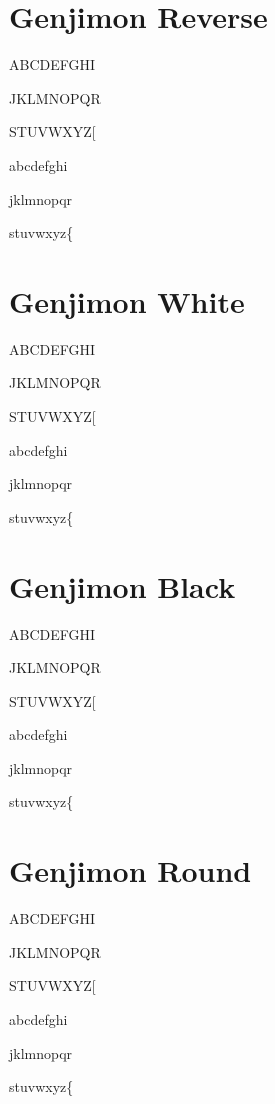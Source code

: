 \documentclass{mitsuba}
\begin{document}

\chapter{Genjimon Reverse}

{
ABCDEFGHI

JKLMNOPQR

STUVWXYZ[

abcdefghi

jklmnopqr

stuvwxyz\{}


\chapter{Genjimon White}

{
ABCDEFGHI

JKLMNOPQR

STUVWXYZ[

abcdefghi

jklmnopqr

stuvwxyz\{}


\chapter{Genjimon Black}

{
ABCDEFGHI

JKLMNOPQR

STUVWXYZ[

abcdefghi

jklmnopqr

stuvwxyz\{}


\chapter{Genjimon Round}

{
ABCDEFGHI

JKLMNOPQR

STUVWXYZ[

abcdefghi

jklmnopqr

stuvwxyz\{}
\end{document}
